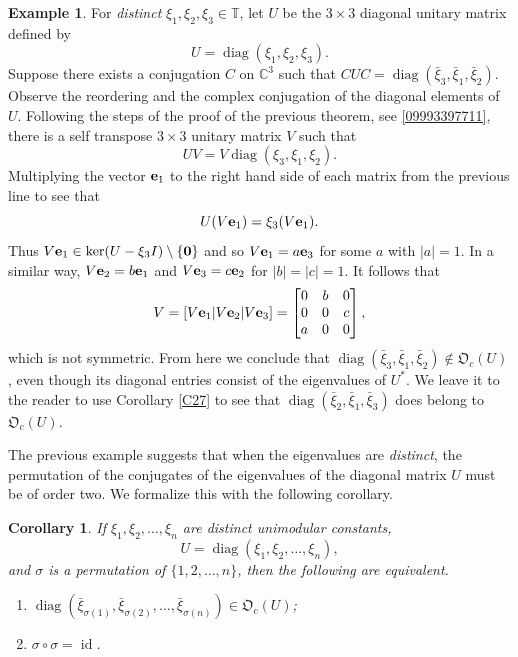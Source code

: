 \documentclass{dis}
\theoremstyle{plain}
\newtheorem{Corollary}[equation]{Corollary}
\theoremstyle{definition}
\newtheorem{Example}[equation]{Example}
\def\T{\mathbb{T}}
\renewcommand{\vec}[1]{{\bf #1}}
\newcommand{\0}{{\color{lightgray}0}}
\begin{document}
\begin{Example}\label{diagoanlalalal}
For {\em distinct} $\xi_1, \xi_2, \xi_3 \in \T$, let $U$ be the $3 \times 3$ diagonal unitary matrix defined by 
$$U = \operatorname{diag}(\xi_1, \xi_2, \xi_3).$$ Suppose there exists a conjugation $C$ on $\mathbb{C}^3$ such that $C U C = \operatorname{diag}(\bar \xi_3, \bar \xi_1, \bar \xi_2)$. Observe the reordering and the complex conjugation of the diagonal elements of $U$. Following the steps of  the proof of the previous theorem, see \eqref{09993397711}, there is a self transpose $3 \times 3$ unitary matrix $V$ such that 
$$UV = V\!\operatorname{diag}(\xi_3, \xi_1, \xi_2).$$
Multiplying the vector $\vec{e}_1$ to the right hand side of each matrix from the previous line to see that 
$$U(V \vec{e}_1) = \xi_3 (V \vec{e}_1).$$
Thus $V \vec{e}_1 \in \ker(U - \xi_3 I) \setminus \{\vec{0}\}$ and so $V \vec{e}_1 = a \vec{e}_3$ for some $a$ with $|a| = 1$. In a similar way, $V \vec{e}_2 = b \vec{e}_1$ and $V \vec{e}_3 = c \vec{e}_2$ for $|b| = |c| = 1$. It follows that 
$$V = [V \vec{e}_1 | V \vec{e}_2 | V \vec{e}_3] = \begin{bmatrix} 0 & b & 0\\ 0 & 0 & c\\ a & 0 & 0\end{bmatrix},$$
which is not symmetric. From here we conclude that  $\operatorname{diag}(\bar \xi_3, \bar \xi_1, \bar \xi_2) \not \in \mathfrak{O}_c(U)$, even though its diagonal entries  consist of the eigenvalues of $U^{*}$. We leave it to the reader to use Corollary \ref{C27} to see that $\operatorname{diag}(\bar \xi_2, \bar \xi_1, \bar \xi_3)$ does belong to $\mathfrak{O}_c(U)$. 
\end{Example}

The previous example suggests that when the eigenvalues are {\em distinct}, the permutation of the conjugates of the eigenvalues of the diagonal matrix $U$ must be of order two. We formalize this with the following corollary. 

\begin{Corollary}\label{sdfugsdfg99991008}
If $\xi_1, \xi_2, \ldots, \xi_n$ are distinct unimodular constants,
$$U = \operatorname{diag}(\xi_1, \xi_2, \ldots, \xi_n),$$ and $\sigma$ is a permutation of $\{1, 2, \ldots, n\}$, then 
the following are equivalent.
\begin{enumerate}
\item $\operatorname{diag}(\bar \xi_{\sigma(1)}, \bar \xi_{\sigma(2)}, \ldots, \bar \xi_{\sigma(n)}) \in \mathfrak{O}_c(U)$;
\item   $\sigma \circ \sigma = \operatorname{id}$. 
\end{enumerate}
\end{Corollary}
\end{document}
